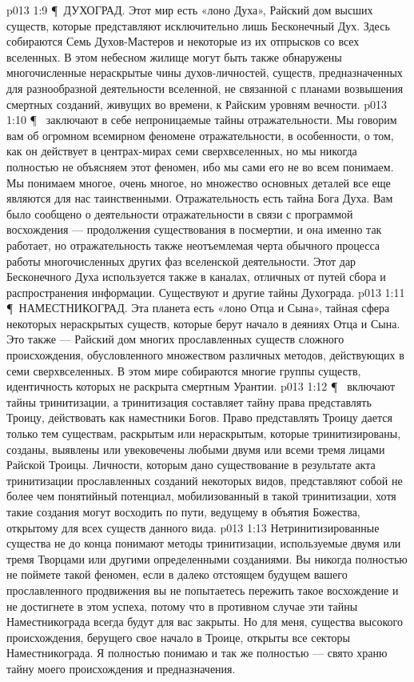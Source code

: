 \vs p013 1:9 \P\ \bibnobreakspace ДУХОГРАД. Этот мир есть «лоно Духа», Райский дом высших существ, которые представляют исключительно лишь Бесконечный Дух. Здесь собираются Семь Духов\hyp{}Мастеров и некоторые из их отпрысков со всех вселенных. В этом небесном жилище могут быть также обнаружены многочисленные нераскрытые чины духов\hyp{}личностей, существ, предназначенных для разнообразной деятельности вселенной, не связанной с планами возвышения смертных созданий, живущих во времени, к Райским уровням вечности.
\vs p013 1:10 \P\  заключают в себе непроницаемые тайны отражательности. Мы говорим вам об огромном всемирном феномене отражательности, в особенности, о том, как он действует в центрах\hyp{}мирах семи сверхвселенных, но мы никогда полностью не объясняем этот феномен, ибо мы сами его не во всем понимаем. Мы понимаем многое, очень многое, но множество основных деталей все еще являются для нас таинственными. Отражательность есть тайна Бога Духа. Вам было сообщено о деятельности отражательности в связи с программой восхождения --- продолжения существования в посмертии, и она именно так работает, но отражательность также неотъемлемая черта обычного процесса работы многочисленных других фаз вселенской деятельности. Этот дар Бесконечного Духа используется также в каналах, отличных от путей сбора и распространения информации. Существуют и другие тайны Духограда.
\vs p013 1:11 \P\ \bibnobreakspace НАМЕСТНИКОГРАД. Эта планета есть «лоно Отца и Сына», тайная сфера некоторых нераскрытых существ, которые берут начало в деяниях Отца и Сына. Это также --- Райский дом многих прославленных существ сложного происхождения, обусловленного множеством различных методов, действующих в семи сверхвселенных. В этом мире собираются многие группы существ, идентичность которых не раскрыта смертным Урантии.
\vs p013 1:12 \P\  включают тайны тринитизации, а тринитизация составляет тайну права представлять Троицу, действовать как наместники Богов. Право представлять Троицу дается только тем существам, раскрытым или нераскрытым, которые тринитизированы, созданы, выявлены или увековечены любыми двумя или всеми тремя лицами Райской Троицы. Личности, которым дано существование в результате акта тринитизации прославленных созданий некоторых видов, представляют собой не более чем понятийный потенциал, мобилизованный в такой тринитизации, хотя такие создания могут восходить по пути, ведущему в объятия Божества, открытому для всех существ данного вида.
\vs p013 1:13 Нетринитизированные существа не до конца понимают методы тринитизации, используемые двумя или тремя Творцами или другими определенными созданиями. Вы никогда полностью не поймете такой феномен, если в далеко отстоящем будущем вашего прославленного продвижения вы не попытаетесь пережить такое восхождение и не достигнете в этом успеха, потому что в противном случае эти тайны Наместникограда всегда будут для вас закрыты. Но для меня, существа высокого происхождения, берущего свое начало в Троице, открыты все секторы Наместникограда. Я полностью понимаю и так же полностью --- свято храню тайну моего происхождения и предназначения.
